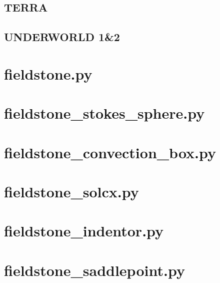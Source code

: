 \documentclass[a4paper]{article}
\begin{document}
\subsection{TERRA}

\subsection{UNDERWORLD 1\&2}




\newpage
\section{fieldstone.py}
%

\newpage
\section{fieldstone\_stokes\_sphere.py}
%

\section{fieldstone\_convection\_box.py}
%

\newpage
\section{fieldstone\_solcx.py}
%

\newpage
\section{fieldstone\_indentor.py}
%

\newpage
\section{fieldstone\_saddlepoint.py}
%


\newpage



\printindex
\end{document}
